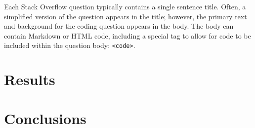 \documentclass{article}
\begin{document}
Each Stack Overflow question typically contains a single sentence title. 
Often, a simplified version of the question appears in the title; however,
the primary text and background for the coding question appears in the body.
The body can contain Markdown or HTML code, including a special tag to allow
for code to be included within the question body: {\tt <code>}.

\section{Results}

\section{Conclusions}

 
\end{document}
